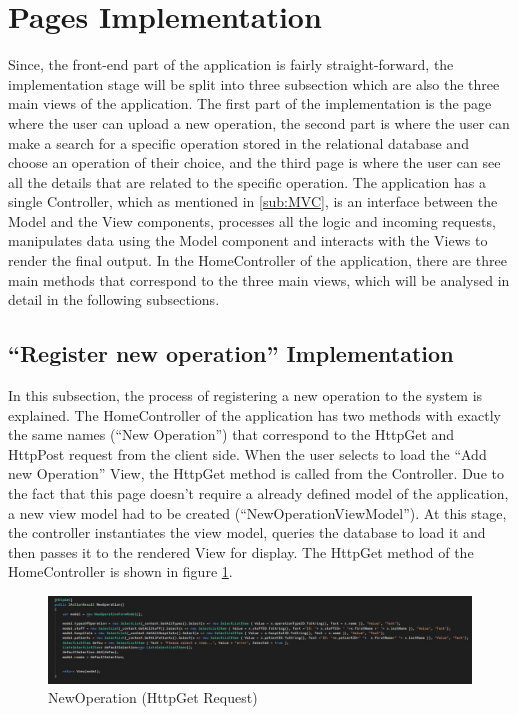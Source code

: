 \section{Pages Implementation}
\label{sec:pages_implementation}

Since, the front-end part of the application is fairly straight-forward, the implementation stage will be split into three subsection which are also the three main views of the application. The first part of the implementation is the page where the user can upload a new operation, the second part is where the user can make a search for a specific operation stored in the relational database and choose an operation of their choice, and the third page is where the user can see all the details that are related to the specific operation.
The application has a single Controller, which as mentioned in \ref{sub:MVC}, is an interface between the Model and the View components, processes all the logic and incoming requests, manipulates data using the Model component and interacts with the Views to render the final output. In the HomeController of the application, there are three main methods that correspond to the three main views, which will be analysed in detail in the following subsections. 


\subsection{``Register new operation'' Implementation}
\label{sub:register_new_operation_implementation}

In this subsection, the process of registering a new operation to the system is explained. The HomeController of the application has two methods with exactly the same names (``New Operation'') that correspond to the HttpGet and HttpPost request from the client side. When the user selects to load the ``Add new Operation'' View, the HttpGet method is called from the Controller. Due to the fact that this page doesn't require a already defined model of the application, a new view model had to be created (``NewOperationViewModel''). 
At this stage, the controller instantiates the view model, queries the database to load it and then passes it to the rendered View for display. The HttpGet method of the HomeController is shown in figure \ref{new_operation_get}.


\begin{figure}[!ht]
\begin{center}
\includegraphics[width=17cm]{imgs/new_operation_get.jpg}
\end{center}\vspace{-0.3cm}
\caption[NewOperation (HttpGet Request)]{NewOperation (HttpGet Request)} \label{new_operation_get}
\end{figure}

